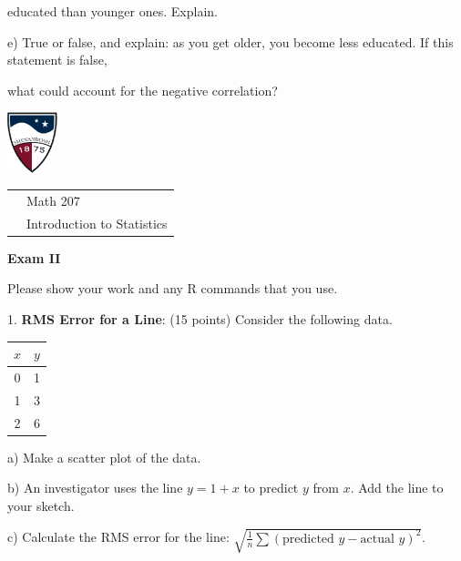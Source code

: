 \documentclass[10pt]{article}
\begin{document}
\hspace{20pt} \hphantom{a) }  educated than younger ones.  Explain.
\vspace{1.4in}


\hspace{20pt} e) True or false, and explain:  as you get older, you become less educated.  
If this statement is false,\vspace{-4pt}

\hspace{20pt} \hphantom{a) }
what could account for the negative correlation?  
\vfill
\eject

\href{http://www.su.edu}{\includegraphics[height=1.75cm]{sulogo.eps}}
\vspace{-1.69cm}

\hfill {\small
\begin{tabular}{cl}
& Math 207\\
& Introduction to Statistics\\
\end{tabular}
}
\setlength{\baselineskip}{1.05\baselineskip}
\bigskip

\begin{center}
\textbf{\large  Exam II}
\end{center}
Please show your work and any R commands that you use.
\medskip


1. \textbf{RMS Error for a Line}: (15 points) Consider the following data.
\begin{tabular}{|c|c|}\hline
$x$ & $y$\\\hline
0   & 1\\
1   & 3\\
2   & 6\\\hline
\end{tabular}

\hspace{10pt} a) Make a scatter plot of the data.  
\vspace{1.7in}

\hspace{10pt} b) An investigator uses the line $y=1 + x$ to predict $y$ from $x$.
Add the line to your sketch.
\medskip

\hspace{10pt} c) Calculate the RMS error for the line:
$\displaystyle\sqrt{\frac{1}{n}\sum\left(\mbox{predicted $y$} - \mbox{actual $y$}\right)^2}$.
\vspace{1.9in}
\end{document}
